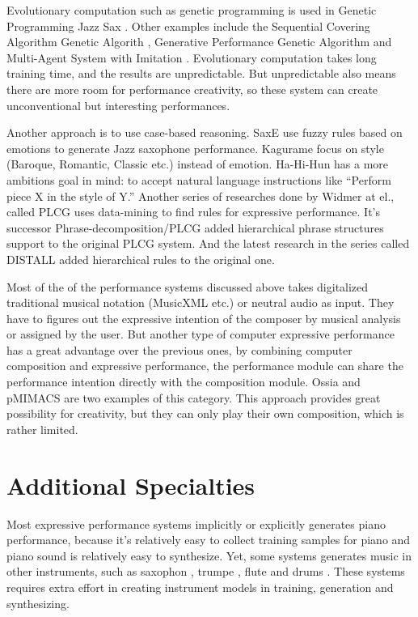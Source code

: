 Evolutionary computation such as genetic programming is used in Genetic Programming Jazz Sax \cite{88}. Other examples include the Sequential Covering Algorithm Genetic Algorith \cite{59}, Generative Performance Genetic Algorithm \cite{89} and Multi-Agent System with Imitation \cite{60, 93}. Evolutionary computation takes long training time, and the results are unpredictable. But unpredictable also means there are more room for performance creativity, so these system can create unconventional but interesting performances.

Another approach is to use case-based reasoning. SaxE \cite{40,41,42} use fuzzy rules based on emotions to generate Jazz saxophone performance. Kagurame \cite{43,44} focus on style (Baroque, Romantic, Classic etc.) instead of emotion. Ha-Hi-Hun \cite{45} has a more ambitions goal in mind: to accept natural language instructions like \enquote{Perform piece X in the style of Y.} Another series of researches done by Widmer at el., called PLCG \cite{46, 47, 48} uses data-mining to find rules for expressive performance. It's successor Phrase-decomposition/PLCG \cite{49} added hierarchical phrase structures support to the original PLCG system. And the latest research in the series called DISTALL \cite{50, 51} added hierarchical rules to the original one.

Most of the of the performance systems discussed above takes digitalized traditional musical notation (MusicXML etc.) or neutral audio as input. They have to figures out the expressive intention of the composer by musical analysis or assigned by the user. But another type of computer expressive performance has a great advantage over the previous ones, by combining computer composition and expressive performance, the performance module can share the performance intention directly with the composition module. Ossia \cite{61} and pMIMACS \cite{pmimacs} are two examples of this category. This approach provides great possibility for creativity, but they can only play their own composition, which is rather limited.

\section{Additional Specialties}

Most expressive performance systems implicitly or explicitly generates piano performance, because it's relatively easy to collect training samples for piano and piano sound is relatively easy to synthesize. Yet, some systems generates music in other instruments, such as saxophon \cite{40, 41, 42}, trumpe \cite{24, 25}, flute \cite{39} and drums \cite{56}. These systems requires extra effort in creating instrument models in training, generation and synthesizing. 

